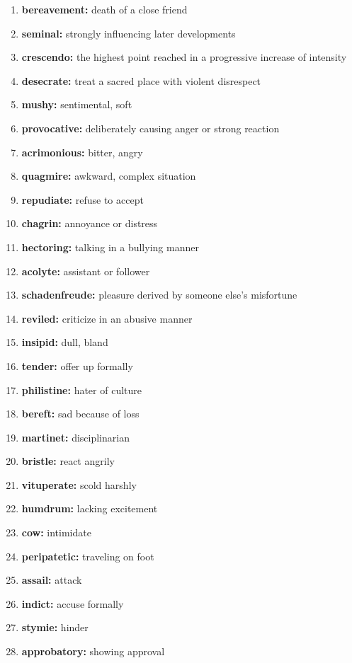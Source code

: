 \documentclass{article}
\begin{document}
\begin{enumerate}
    \item \textbf{bereavement: }{death of a close friend}
    \item \textbf{seminal: }{strongly influencing later developments}
    \item \textbf{crescendo: }{the highest point reached in a progressive increase of intensity}
    \item \textbf{desecrate: }{treat a sacred place with violent disrespect}
    \item \textbf{mushy: }{sentimental, soft}
    \item \textbf{provocative: }{deliberately causing anger or strong reaction}
    \item \textbf{acrimonious: }{bitter, angry}
    \item \textbf{quagmire: }{awkward, complex situation}
    \item \textbf{repudiate: }{refuse to accept}
    \item \textbf{chagrin: }{annoyance or distress}
    \item \textbf{hectoring: }{talking in a bullying manner}
    \item \textbf{acolyte: }{assistant or follower}
    \item \textbf{schadenfreude: }{pleasure derived by someone else's misfortune}
    \item \textbf{reviled: }{criticize in an abusive manner}
    \item \textbf{insipid: }{dull, bland}
    \item \textbf{tender: }{offer up formally}
    \item \textbf{philistine: }{hater of culture}
    \item \textbf{bereft: }{sad because of loss}
    \item \textbf{martinet: }{disciplinarian}
    \item \textbf{bristle: }{react angrily}
    \item \textbf{vituperate: }{scold harshly}
    \item \textbf{humdrum: }{lacking excitement}
    \item \textbf{cow: }{intimidate}
    \item \textbf{peripatetic: }{traveling on foot}
    \item \textbf{assail: }{attack}
    \item \textbf{indict: }{accuse formally}
    \item \textbf{stymie: }{hinder}
    \item \textbf{approbatory: }{showing approval}

\end{enumerate}
\end{document}
